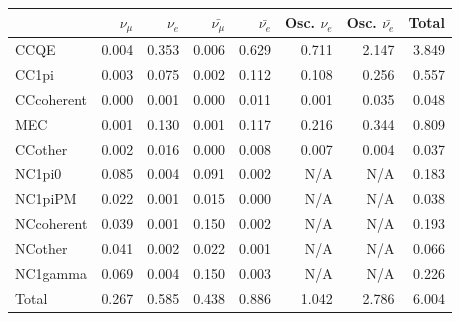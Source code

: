 
\begin{table}
\center
\begin{tabular} { | l ||r | r | r | r | r | r | | r | }
\hline

              & $\nu_\mu$            & $\nu_e$              & $\bar{\nu_\mu}$      & $\bar{\nu_e}$        & Osc. $\nu_e$         & Osc. $\bar{\nu_e}$   & Total                \\ \hline\hline
 CCQE         & 0.004                & 0.353                & 0.006                & 0.629                & 0.711                & 2.147                & 3.849                \\ \hline
 CC1pi        & 0.003                & 0.075                & 0.002                & 0.112                & 0.108                & 0.256                & 0.557                \\ \hline
 CCcoherent   & 0.000                & 0.001                & 0.000                & 0.011                & 0.001                & 0.035                & 0.048                \\ \hline
 MEC          & 0.001                & 0.130                & 0.001                & 0.117                & 0.216                & 0.344                & 0.809                \\ \hline
 CCother      & 0.002                & 0.016                & 0.000                & 0.008                & 0.007                & 0.004                & 0.037                \\ \hline
 NC1pi0       & 0.085                & 0.004                & 0.091                & 0.002                & N/A                  & N/A                  & 0.183                \\ \hline
 NC1piPM      & 0.022                & 0.001                & 0.015                & 0.000                & N/A                  & N/A                  & 0.038                \\ \hline
 NCcoherent   & 0.039                & 0.001                & 0.150                & 0.002                & N/A                  & N/A                  & 0.193                \\ \hline
 NCother      & 0.041                & 0.002                & 0.022                & 0.001                & N/A                  & N/A                  & 0.066                \\ \hline
 NC1gamma     & 0.069                & 0.004                & 0.150                & 0.003                & N/A                  & N/A                  & 0.226                \\ \hline
\hline
 Total        & 0.267                & 0.585                & 0.438                & 0.886                & 1.042                & 2.786                & 6.004                \\ \hline


\end{tabular}
\end{table}
